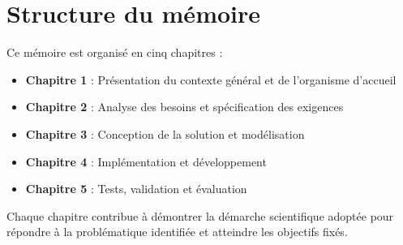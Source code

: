 \section{Structure du mémoire}

Ce mémoire est organisé en cinq chapitres :

\begin{itemize}
    \item \textbf{Chapitre 1} : Présentation du contexte général et de l'organisme d'accueil
    \item \textbf{Chapitre 2} : Analyse des besoins et spécification des exigences
    \item \textbf{Chapitre 3} : Conception de la solution et modélisation
    \item \textbf{Chapitre 4} : Implémentation et développement
    \item \textbf{Chapitre 5} : Tests, validation et évaluation
\end{itemize}

Chaque chapitre contribue à démontrer la démarche scientifique adoptée pour répondre à la problématique identifiée et atteindre les objectifs fixés.

